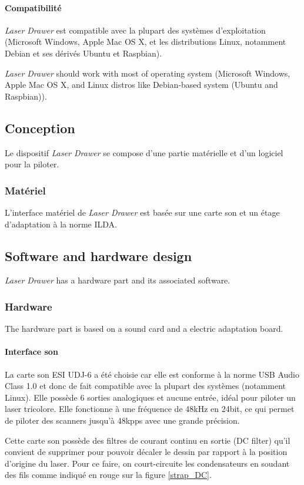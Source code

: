 \begin{fr}
\paragraph*{Compatibilité}
\textit{Laser Drawer} est compatible avec la plupart des systèmes d'exploitation (Microsoft Windows, Apple Mac OS X, et les distributions Linux, notamment Debian et ses dérivés Ubuntu et Raspbian).
\end{fr}

\begin{en}
\textit{Laser Drawer} should work with most of operating system (Microsoft Windows, Apple Mac OS X, and Linux distros like Debian-based system (Ubuntu and Raspbian)).
\end{en}

\begin{fr}
\subsection{Conception}
Le dispositif \textit{Laser Drawer} se compose d'une partie matérielle et d'un logiciel pour la piloter.
\subsubsection{Matériel}
L'interface matériel de \textit{Laser Drawer} est basée sur une carte son et un étage d'adaptation à la norme ILDA.
\end{fr}

\begin{en}
\subsection{Software and hardware design}
\textit{Laser Drawer} has a hardware part and its associated software.
\subsubsection{Hardware}
The hardware part is based on a sound card and a electric adaptation board.
\end{en}


\begin{fr}
\paragraph*{Interface son}
La carte son ESI UDJ-6 a été choisie car elle est conforme à la norme USB Audio Class 1.0 et donc de fait compatible avec la plupart des systèmes (notamment Linux). 
Elle possède 6 sorties analogiques et aucune entrée, idéal pour piloter un laser tricolore. 
Elle fonctionne à une fréquence de 48\unit{kHz} en 24\unit{bit}, ce qui permet de piloter des scanners jusqu'à 48\unit{kpps} avec une grande précision.

Cette carte son possède des filtres de courant continu en sortie (DC filter) qu'il convient de supprimer pour pouvoir décaler le dessin par rapport à la position d'origine du laser. Pour ce faire, on court-circuite les condensateurs en soudant des fils comme indiqué en rouge sur la figure \ref{strap_DC}.
\end{fr}

